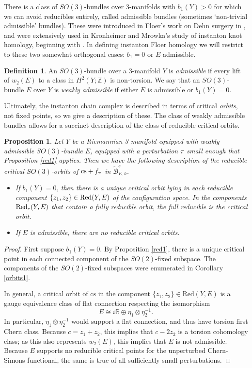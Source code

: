 \documentclass{memo-l}
\newtheorem{proposition}[theorem]{Proposition}
\theoremstyle{definition}
\newtheorem{definition}[theorem]{Definition}
\theoremstyle{remark}
\numberwithin{section}{chapter}
\numberwithin{equation}{chapter}
\begin{document}
There is a class of $SO(3)$-bundles over 3-manifolds with $b_1(Y) > 0$ for which we can avoid reducibles entirely, called admissible bundles (sometimes `non-trivial admissible' bundles). These were introduced in Floer's work on Dehn surgery in \cite{floer1995instanton}, and were extensively used in Kronheimer and Mrowka's study of instanton knot homology, beginning with \cite{KM1}. In defining instanton Floer homology we will restrict to these two somewhat orthogonal cases: $b_1 = 0$ or $E$ admissible.

\begin{definition}\label{admiss-3m}An $SO(3)$-bundle over a 3-manifold $Y$ is \textit{admissible} if every lift of $w_2(E)$ to a class in $H^2(Y;\mathbb Z)$ is non-torsion. We say that an $SO(3)$-bundle $E$ over $Y$ is \textit{weakly admissible} if either $E$ is admissible or $b_1(Y) = 0$.\end{definition}

Ultimately, the instanton chain complex is described in terms of critical \textit{orbits}, not fixed points, so we give a description of these. The class of weakly admissible bundles allows for a succinct description of the class of reducible critical orbits.

\begin{proposition}\label{redcrit}Let $Y$ be a Riemannian 3-manifold equipped with weakly admissible $SO(3)$-bundle $E$, equipped with a perturbation $\pi$ small enough that Proposition \ref{red1} applies. Then we have the following description of the reducible critical $SO(3)$-orbits of $\textup{cs}+f_\pi$ in $\widetilde{\mathcal B}^e_{E,k}$.
\begin{itemize}
    \item If $b_1(Y) = 0$, then there is a unique critical orbit lying in each reducible component $\{z_1, z_2\} \in \textup{Red}(Y,E)$ of the configuration space. In the components $\textup{Red}_*(Y,E)$ that contain a fully reducible orbit, the full reducible is the critical orbit.
    \item If $E$ is admissible, there are no reducible critical orbits.
\end{itemize}
\end{proposition}

\begin{proof}First suppose $b_1(Y) = 0$. By Proposition \ref{red1}, there is a unique critical point in each connected component of the $SO(2)$-fixed subspace. The components of the $SO(2)$-fixed subspaces were enumerated in Corollary \ref{orbits1}.

In general, a critical orbit of $\text{cs}$ in the component $\{z_1, z_2\} \in \text{Red}(Y,E)$ is a gauge equivalence class of flat connection respecting the isomorphism 
$$E \cong i\mathbb R \oplus \eta_1 \otimes \eta_2^{-1}.$$ 
In particular, $\eta_1 \otimes \eta_2^{-1}$ would support a flat connection, and thus have torsion first Chern class. Because $c = z_1 + z_2$, this implies that $c - 2z_2$ is a torsion cohomology class; as this also represents $w_2(E)$, this implies that $E$ is not admissible. Because $E$ supports no reducible critical points for the unperturbed Chern-Simons functional, the same is true of all sufficiently small perturbations.
\end{proof}
\end{document}
